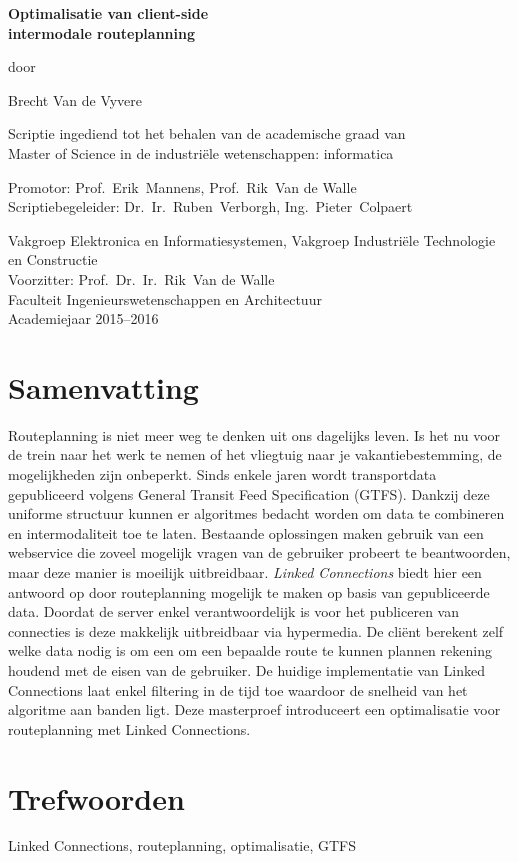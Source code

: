 
\newpage

{
\setlength{\baselineskip}{14pt}
\setlength{\parindent}{0pt}
\setlength{\parskip}{8pt}

\begin{center}

\noindent \textbf{\huge
Optimalisatie van client-side\\[8pt]
intermodale routeplanning
}

door 

Brecht Van de Vyvere

Scriptie ingediend tot het behalen van de academische graad van\\
Master of Science in de industri\"ele wetenschappen: informatica

Promotor: Prof.~Erik~Mannens, Prof.~Rik~Van de Walle\\
Scriptiebegeleider: Dr.~Ir.~Ruben~Verborgh, Ing.~Pieter~Colpaert

Vakgroep Elektronica en Informatiesystemen, Vakgroep Industri\"ele Technologie en Constructie\\
Voorzitter: Prof.~Dr.~Ir.~Rik~Van de Walle\\
Faculteit Ingenieurswetenschappen en Architectuur\\
Academiejaar 2015--2016


\end{center}

\section*{Samenvatting}


Routeplanning is niet meer weg te denken uit ons dagelijks leven. Is het nu voor de trein naar het werk te nemen of het vliegtuig naar je vakantiebestemming, de mogelijkheden zijn onbeperkt. Sinds enkele jaren wordt transportdata gepubliceerd volgens General Transit Feed Specification (GTFS). Dankzij deze uniforme structuur kunnen er algoritmes bedacht worden om data te combineren en intermodaliteit toe te laten. Bestaande oplossingen maken gebruik van een webservice die zoveel mogelijk vragen van de gebruiker probeert te beantwoorden, maar deze manier is moeilijk uitbreidbaar. \textit{Linked Connections} biedt hier een antwoord op door routeplanning mogelijk te maken op basis van gepubliceerde data. Doordat de server enkel verantwoordelijk is voor het publiceren van connecties is deze makkelijk uitbreidbaar via hypermedia. De cli\"ent berekent zelf welke data nodig is om een om een bepaalde route te kunnen plannen rekening houdend met de eisen van de gebruiker. De huidige implementatie van Linked Connections laat enkel filtering in de tijd toe waardoor de snelheid van het algoritme aan banden ligt. Deze masterproef introduceert een optimalisatie voor routeplanning met Linked Connections.

\section*{Trefwoorden}


Linked Connections, routeplanning, optimalisatie, GTFS

}

\newpage %
